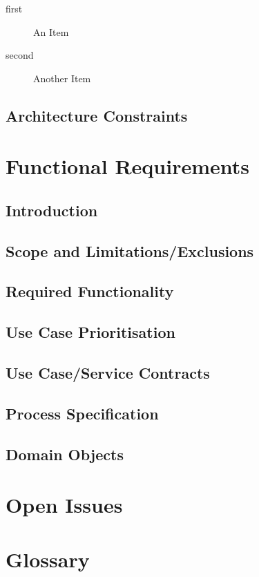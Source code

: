 \documentclass[a4paper]{article}
\begin{document}
\begin{description}

\item[first]{An Item}

\item[second]{Another Item}

\end{description}

\subsection{Architecture Constraints}

\section{Functional Requirements}

\subsection{Introduction}

\subsection{Scope and Limitations/Exclusions}

\subsection{Required Functionality}

\subsection{Use Case Prioritisation}

\subsection{Use Case/Service Contracts}

\subsection{Process Specification}

\subsection{Domain Objects}

\section{Open Issues}

\section{Glossary}
\end{document}
